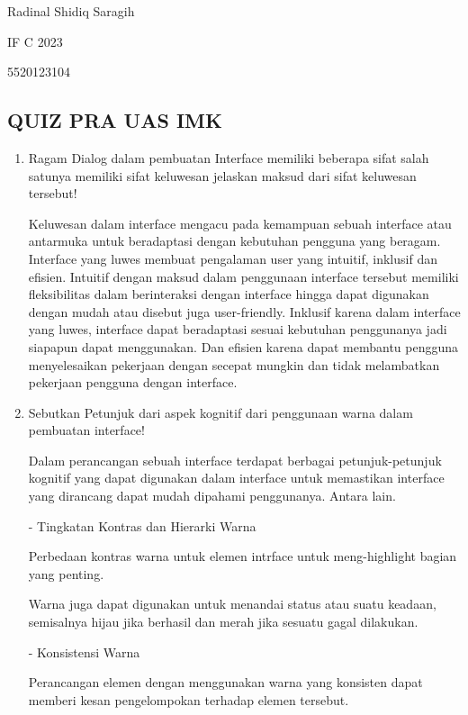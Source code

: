 \documentclass[12pt,a4paper]{article}
\date{}
\begin{document}
Radinal Shidiq Saragih

IF C 2023

5520123104

\begin{center}
  \section*{QUIZ PRA UAS IMK}
  \vspace{1cm}
\end{center}

\begin{enumerate}
  \item Ragam Dialog dalam pembuatan Interface memiliki beberapa sifat salah satunya memiliki sifat keluwesan jelaskan maksud dari sifat keluwesan tersebut!

    Keluwesan dalam interface mengacu pada kemampuan sebuah interface atau antarmuka untuk
    beradaptasi dengan kebutuhan pengguna yang beragam. Interface yang luwes membuat
    pengalaman user yang intuitif, inklusif dan efisien. Intuitif dengan maksud dalam
    penggunaan interface tersebut memiliki fleksibilitas dalam berinteraksi dengan
    interface hingga dapat digunakan dengan mudah atau disebut juga user-friendly.
    Inklusif karena dalam interface yang luwes, interface dapat beradaptasi sesuai
    kebutuhan penggunanya jadi siapapun dapat menggunakan. Dan efisien karena
    dapat membantu pengguna menyelesaikan pekerjaan dengan secepat mungkin dan
    tidak melambatkan pekerjaan pengguna dengan interface.

  \item Sebutkan Petunjuk dari aspek kognitif dari penggunaan warna dalam pembuatan interface!

    Dalam perancangan sebuah interface terdapat berbagai petunjuk-petunjuk kognitif yang dapat
    digunakan dalam interface untuk memastikan interface yang dirancang dapat mudah
    dipahami penggunanya. Antara lain.

    - Tingkatan Kontras dan Hierarki Warna

    Perbedaan kontras warna untuk elemen intrface untuk meng-highlight bagian yang
    penting.

    Warna juga dapat digunakan untuk menandai status atau suatu keadaan, semisalnya
    hijau jika berhasil dan merah jika sesuatu gagal dilakukan.

    - Konsistensi Warna

    Perancangan elemen dengan menggunakan warna yang konsisten dapat memberi
    kesan pengelompokan terhadap elemen tersebut.


\end{enumerate}
\end{document}
